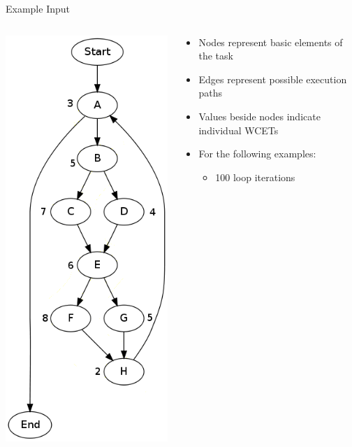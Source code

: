 \documentclass{beamer}
\begin{document}
\begin{frame}{Example Input}
  \begin{columns}
    \begin{column}{0.25\textwidth}
      \includegraphics[scale=0.3]{input.png}
    \end{column}
    \begin{column}{0.75\textwidth}
      \begin{itemize}
        \item Nodes represent basic elements of the task
        \item Edges represent possible execution paths
        \item Values beside nodes indicate individual WCETs
        \item For the following examples:
          \begin{itemize}
            \item 100 loop iterations
          \end{itemize}
      \end{itemize}
    \end{column}
  \end{columns}
\end{frame}
\end{document}
